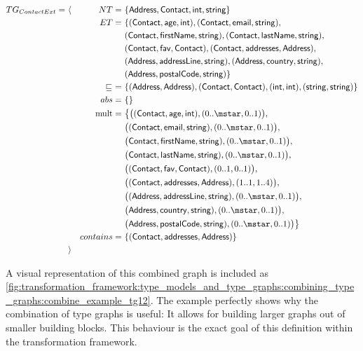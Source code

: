 \begin{align*}
TG_{ContactExt} =\ &\langle&
NT =\ &\{ \type{Address}, \type{Contact}, \type{int}, \type{string} \} \\&&
ET =\ &\{ 
( \type{Contact}, \type{age}, \type{int} ),
( \type{Contact}, \type{email}, \type{string} ),\\&&&
( \type{Contact}, \type{firstName}, \type{string} ),
( \type{Contact}, \type{lastName}, \type{string} ), \\&&&
( \type{Contact}, \type{fav}, \type{Contact} ),
( \type{Contact}, \type{addresses}, \type{Address} ), \\&&&
( \type{Address}, \type{addressLine}, \type{string} ),
( \type{Address}, \type{country}, \type{string} ),\\&&&
( \type{Address}, \type{postalCode}, \type{string} )
\} \\&&
\sqsubseteq\ =\ &\{
( \type{Address}, \type{Address} ),
( \type{Contact}, \type{Contact} ),
( \type{int}, \type{int} ),
( \type{string}, \type{string} )
\} \\&&
abs =\ &\{\} \\&&
\mathrm{mult} =\ &\big\{
\big( ( \type{Contact}, \type{age}, \type{int} ), ( 0..\mstar, 0..1 ) \big),\\&&&
\big( ( \type{Contact}, \type{email}, \type{string} ), ( 0..\mstar, 0..1 ) \big),\\&&&
\big( \type{Contact}, \type{firstName}, \type{string} ), ( 0..\mstar, 0..1 ) \big),\\&&&
\big( \type{Contact}, \type{lastName}, \type{string} ), ( 0..\mstar, 0..1 ) \big),\\&&&
\big( ( \type{Contact}, \type{fav}, \type{Contact} ), ( 0..1, 0..1 ) \big),\\&&&
\big( ( \type{Contact}, \type{addresses}, \type{Address} ), ( 1..1, 1..4 ) \big),\\&&&
\big( ( \type{Address}, \type{addressLine}, \type{string} ), ( 0..\mstar, 0..1 ) \big),\\&&&
\big( \type{Address}, \type{country}, \type{string} ), ( 0..\mstar, 0..1 ) \big),\\&&&
\big( \type{Address}, \type{postalCode}, \type{string} ), ( 0..\mstar, 0..1 ) \big)
\big\} \\&&
contains =\ &\{
( \type{Contact}, \type{addresses}, \type{Address} )
\}
\\&\rangle
\end{align*}

A visual representation of this combined graph is included as \cref{fig:transformation_framework:type_models_and_type_graphs:combining_type_graphs:combine_example_tg12}. The example perfectly shows why the combination of type graphs is useful: It allows for building larger graphs out of smaller building blocks. This behaviour is the exact goal of this definition within the transformation framework.

